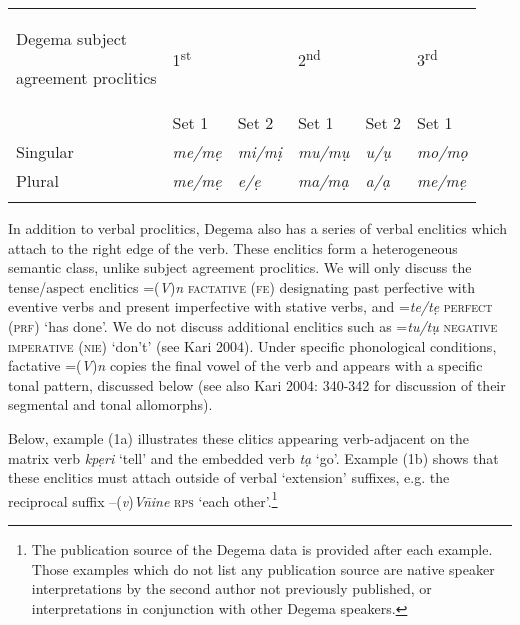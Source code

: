 \begin{tabularx}{\textwidth}{XXXXXX}
\lsptoprule

{\mdseries Degema subject }

{\mdseries agreement proclitics} & \multicolumn{2}{X}{ 1\textsuperscript{st}\par

} & \multicolumn{2}{X}{ 2\textsuperscript{nd}\par

} & 3\textsuperscript{rd}\par\\
\hhline{-~~~~~} & {\mdseries Set 1} & {\mdseries Set 2} & {\mdseries Set 1} & {\mdseries Set 2} & {\mdseries Set 1}\\
{\mdseries Singular} & {\itshape me/mẹ} & {\itshape mi/mị} & {\itshape mu/mụ} & {\itshape u/ụ} & {\itshape mo/mọ}\\
{\mdseries Plural} & {\itshape me/mẹ} & {\itshape e/ẹ} & {\itshape ma/mạ} & {\itshape a/ạ} & {\itshape me/mẹ}\\
\lspbottomrule
\end{tabularx}
In addition to verbal proclitics, Degema also has a series of verbal enclitics which attach to the right edge of the verb. These enclitics form a heterogeneous semantic class, unlike subject agreement proclitics. We will only discuss the tense/aspect enclitics =(\textit{V})\textit{n} \textsc{factative (fe) }designating past perfective with eventive verbs and present imperfective with stative verbs, and =\textit{te/tẹ} \textsc{perfect} (\textsc{prf}) ‘has done’. We do not discuss additional enclitics such as =\textit{tu/tụ} \textsc{negative imperative (nie)} ‘don’t’ (see Kari 2004). Under specific phonological conditions, factative =(\textit{V})\textit{n} copies the final vowel of the verb and appears with a specific tonal pattern, discussed below (see also Kari 2004: 340-342 for discussion of their segmental and tonal allomorphs).   

  Below, example (1a) illustrates these clitics appearing verb-adjacent on the matrix verb \textit{kpẹri }‘tell’ and the embedded verb \textit{tạ} ‘go’. Example (1b) shows that these enclitics must attach outside of verbal ‘extension’ suffixes, e.g. the reciprocal suffix –(\textit{v})\textit{V\={n}ine} \textsc{rps} ‘each other’.\footnote{The publication source of the Degema data is provided after each example. Those examples which do not list any publication source are native speaker interpretations by the second author not previously published, or interpretations in conjunction with other Degema speakers. 
}

